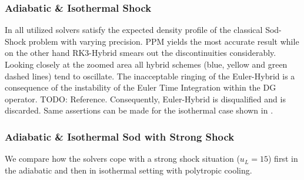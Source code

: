 \subsubsection{Adiabatic \& Isothermal Shock}
In  all utilized solvers satisfy the
expected density profile of the classical Sod-Shock problem with varying
precision. PPM yields the most accurate result while on the other hand
RK3-Hybrid smears out the discontinuities considerably. Looking closely at the
zoomed area all hybrid schemes (blue, yellow and green dashed lines) tend to
oscillate.  The inacceptable ringing of the Euler-Hybrid is a consequence of
the instability of the Euler Time Integration within the DG operator. TODO:
Reference. Consequently, Euler-Hybrid is disqualified and is discarded.
Same assertions can be made for the isothermal case shown in
.

\subsubsection{Adiabatic \& Isothermal Sod with Strong Shock}
We compare how the solvers cope with a strong shock situation ($u_L = 15$)
first in the adiabatic and then in isothermal setting with polytropic cooling.

